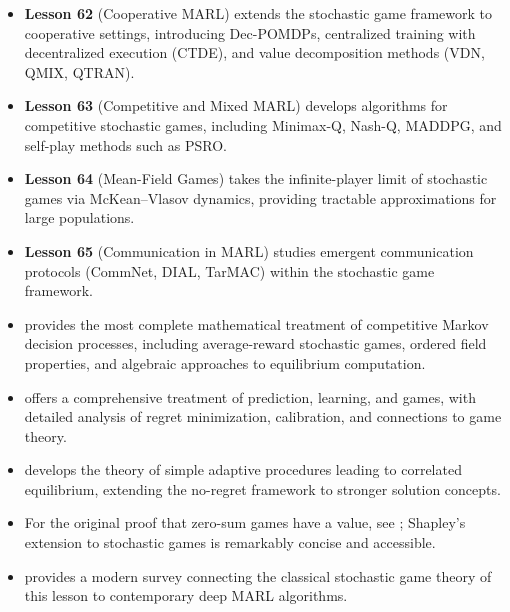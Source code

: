 \documentclass[11pt,a4paper]{article}
\begin{document}
\begin{itemize}
  \item \textbf{Lesson 62} (Cooperative MARL) extends the stochastic
    game framework to cooperative settings, introducing Dec-POMDPs,
    centralized training with decentralized execution (CTDE), and
    value decomposition methods (VDN, QMIX, QTRAN).

  \item \textbf{Lesson 63} (Competitive and Mixed MARL) develops
    algorithms for competitive stochastic games, including
    Minimax-Q, Nash-Q, MADDPG, and self-play methods such as PSRO.

  \item \textbf{Lesson 64} (Mean-Field Games) takes the
    infinite-player limit of stochastic games via McKean--Vlasov
    dynamics, providing tractable approximations for large
    populations.

  \item \textbf{Lesson 65} (Communication in MARL) studies emergent
    communication protocols (CommNet, DIAL, TarMAC) within the
    stochastic game framework.

  \item \citet{filar1997} provides the most complete mathematical
    treatment of competitive Markov decision processes, including
    average-reward stochastic games, ordered field properties, and
    algebraic approaches to equilibrium computation.

  \item \citet{cesa2006} offers a comprehensive treatment of
    prediction, learning, and games, with detailed analysis of
    regret minimization, calibration, and connections to game theory.

  \item \citet{hart2000} develops the theory of simple adaptive
    procedures leading to correlated equilibrium, extending the
    no-regret framework to stronger solution concepts.

  \item For the original proof that zero-sum games have a value,
    see \citet{vonneumann1928}; Shapley's extension to stochastic
    games \citep{shapley1953} is remarkably concise and accessible.

  \item \citet{zhang2021} provides a modern survey connecting the
    classical stochastic game theory of this lesson to contemporary
    deep MARL algorithms.
\end{itemize}


\end{document}
